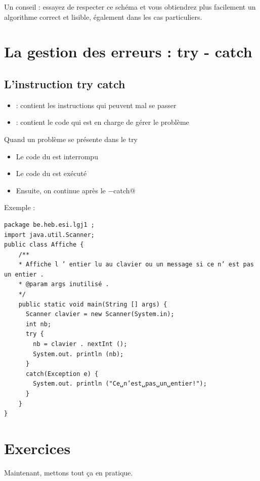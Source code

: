 \documentclass[11pt,a4paper]{article}
\begin{document}
            \par
        
        Un conseil : essayez de respecter ce sch\'ema et vous obtiendrez plus facilement un algorithme
        correct et lisible, \'egalement dans les cas particuliers.
      
            \par
        \section{La gestion des erreurs : try - catch}\subsection{L'instruction try catch}
					\begin{itemize}
				
			\item \verb@try@ : contient les instructions qui peuvent mal se passer
			\item \verb@catch@ : contient le code qui est en charge de g\'erer le probl\`eme
					\end{itemize}
				
        Quand un probl\`eme se pr\'esente dans le try
        
					\begin{itemize}
				
			\item Le code du \verb@try@ est interrompu
			\item Le code du \verb@catch@ est ex\'ecut\'e
			\item Ensuite, on continue apr\`es le \verb@try−catch@
					\end{itemize}
				
		  Exemple :
\begin{verbatim}
package be.heb.esi.lgj1 ;
import java.util.Scanner;
public class Affiche {
    /**
    * Affiche l ’ entier lu au clavier ou un message si ce n’ est pas un entier .
    * @param args inutilisé .
    */
    public static void main(String [] args) {
      Scanner clavier = new Scanner(System.in);
      int nb;
      try {
        nb = clavier . nextInt ();
        System.out. println (nb);
      }
      catch(Exception e) {
        System.out. println ("Ce␣n’est␣pas␣un␣entier!");
      }
    }
}
\end{verbatim}\section{Exercices}
				Maintenant, mettons tout \c ca en pratique.
      
\end{document}

